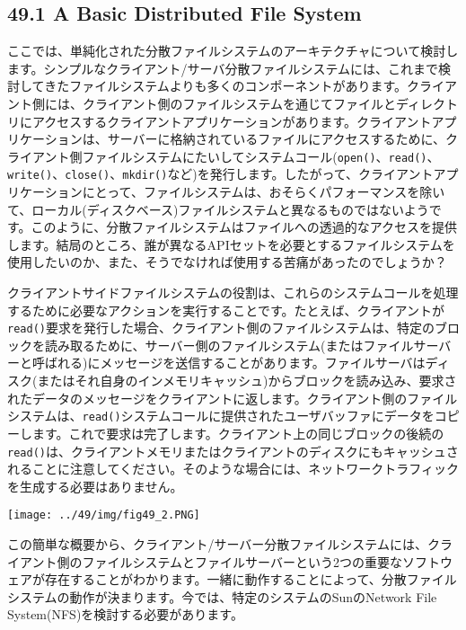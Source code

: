 \hypertarget{a-basic-distributed-file-system}{%
\subsection*{49.1 A Basic Distributed File
System}\label{a-basic-distributed-file-system}}

ここでは、単純化された分散ファイルシステムのアーキテクチャについて検討します。シンプルなクライアント/サーバ分散ファイルシステムには、これまで検討してきたファイルシステムよりも多くのコンポーネントがあります。クライアント側には、クライアント側のファイルシステムを通じてファイルとディレクトリにアクセスするクライアントアプリケーションがあります。クライアントアプリケーションは、サーバーに格納されているファイルにアクセスするために、クライアント側ファイルシステムにたいしてシステムコール(\texttt{open()}、\texttt{read()}、\texttt{write()}、\texttt{close()}、\texttt{mkdir()}など)を発行します。したがって、クライアントアプリケーションにとって、ファイルシステムは、おそらくパフォーマンスを除いて、ローカル(ディスクベース)ファイルシステムと異なるものではないようです。このように、分散ファイルシステムはファイルへの透過的なアクセスを提供します。結局のところ、誰が異なるAPIセットを必要とするファイルシステムを使用したいのか、また、そうでなければ使用する苦痛があったのでしょうか？

クライアントサイドファイルシステムの役割は、これらのシステムコールを処理するために必要なアクションを実行することです。たとえば、クライアントが\texttt{read()}要求を発行した場合、クライアント側のファイルシステムは、特定のブロックを読み取るために、サーバー側のファイルシステム(またはファイルサーバーと呼ばれる)にメッセージを送信することがあります。ファイルサーバはディスク(またはそれ自身のインメモリキャッシュ)からブロックを読み込み、要求されたデータのメッセージをクライアントに返します。クライアント側のファイルシステムは、\texttt{read()}システムコールに提供されたユーザバッファにデータをコピーします。これで要求は完了します。クライアント上の同じブロックの後続の\texttt{read()}は、クライアントメモリまたはクライアントのディスクにもキャッシュされることに注意してください。そのような場合には、ネットワークトラフィックを生成する必要はありません。

\texttt{[image: ../49/img/fig49\_2.PNG]}

この簡単な概要から、クライアント/サーバー分散ファイルシステムには、クライアント側のファイルシステムとファイルサーバーという2つの重要なソフトウェアが存在することがわかります。一緒に動作することによって、分散ファイルシステムの動作が決まります。今では、特定のシステムのSunのNetwork
File System(NFS)を検討する必要があります。

